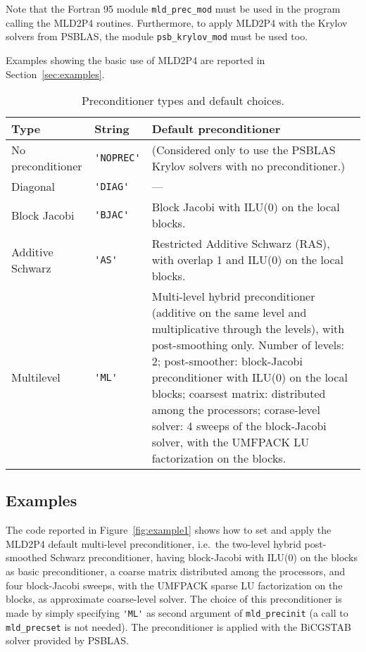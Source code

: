 Note that the Fortran 95 module \verb|mld_prec_mod| must be used in the program
calling the MLD2P4 routines. Furthermore, to apply MLD2P4 with the Krylov solvers
from PSBLAS, the module \verb|psb_krylov_mod| must be used too.

Examples showing the basic use of MLD2P4 are reported in Section~\ref{sec:examples}.

\begin{table}[th]
{
\begin{center}
\begin{tabular}{|l|l|p{6.7cm}|}
\hline
Type              & String        & Default preconditioner \\ \hline
No preconditioner &\verb|'NOPREC'|& (Considered only to use the PSBLAS
                                    Krylov solvers with no preconditioner.) \\
Diagonal          & \verb|'DIAG'| & --- \\
Block Jacobi      & \verb|'BJAC'| & Block Jacobi with ILU(0) on the local blocks.\\ 
Additive Schwarz  & \verb|'AS'|   & Restricted Additive Schwarz (RAS),
                                    with overlap 1 and ILU(0) on the local blocks. \\ 
Multilevel        &\verb|'ML'|    & Multi-level hybrid preconditioner (additive on the
                                    same level and multiplicative through the levels),
                                    with post-smoothing only. Number of levels: 2;
                                    post-smoother: block-Jacobi preconditioner with ILU(0)
                                    on the local blocks; coarsest matrix: distributed among the
                                    processors; corase-level solver: 4 sweeps of the block-Jacobi
                                    solver, with the UMFPACK LU factorization on the blocks. \\
\hline
\end{tabular}
\end{center}
}
\caption{Preconditioner types and default choices.\label{tab:precinit}}
\end{table}

\subsection{Examples\label{sec:examples}}

The code reported in Figure~\ref{fig:example1} shows how to set and apply the MLD2P4 default
multi-level preconditioner, i.e.\ the two-level hybrid post-smoothed Schwarz preconditioner,
having block-Jacobi with ILU(0) on the blocks as basic preconditioner,
a coarse matrix distributed among the processors, and four block-Jacobi
sweeps, with the UMFPACK sparse LU factorization on the blocks, as approximate coarse-level solver.
The choice of this preconditioner is made
by simply specifying \verb|'ML'| as second argument of \verb|mld_precinit|
(a call to \verb|mld_precset| is not needed).
The preconditioner is applied with the BiCGSTAB solver provided by PSBLAS. 

